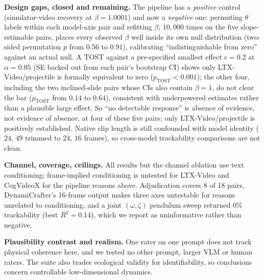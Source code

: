 \documentclass[10pt,twocolumn,letterpaper]{article}
\begin{document}
\textbf{Design gaps, closed and remaining.} The pipeline has a
\emph{positive} control (simulator-video recovery at $\beta=1.0001$) and
now a \emph{negative} one: permuting $\theta$ labels within each
model-axis pair and refitting $\beta$, $10{,}000$ times on the five
slope-estimable pairs, places every observed $\beta$ well inside its own
null distribution (two-sided permutation $p$ from $0.56$ to $0.91$),
calibrating ``indistinguishable from zero'' against an actual null. A
TOST against a pre-specified smallest effect $\epsilon=0.2$ at
$\alpha=0.05$ (SE backed out from each pair's bootstrap CI) shows only
LTX-Video/projectile is formally equivalent to zero ($p_\text{TOST}<0.001$);
the other four, including the two inclined-slide pairs whose CIs also
contain $\beta=1$, do not clear the bar ($p_\text{TOST}$ from $0.14$ to
$0.64$), consistent with underpowered estimates rather than a plausible
large effect. So ``no detectable response'' is absence of evidence, not
evidence of absence, at four of these five pairs; only LTX-Video/projectile
is positively established. Native clip length is still confounded with
model identity ($24$, $49$ trimmed to $24$, $16$ frames), so cross-model
trackability comparisons are not clean.

\textbf{Channel, coverage, ceilings.} All results but the channel ablation use
text conditioning; frame-implied conditioning is untested for LTX-Video and
CogVideoX for the pipeline reasons above. Adjudication covers 8 of 18 pairs,
DynamiCrafter's 16-frame output makes three axes untestable for reasons
unrelated to conditioning, and a joint $(\omega,\zeta)$ pendulum sweep
returned $0\%$ trackability (best $R^2=0.14$), which we report as
uninformative rather than negative.

\textbf{Plausibility contrast and realism.} One rater on one prompt does not
track physical coherence here, and we tested no other prompt, larger VLM or
human raters. The suite also trades ecological validity for identifiability,
so conclusions concern controllable low-dimensional dynamics.

\end{document}
